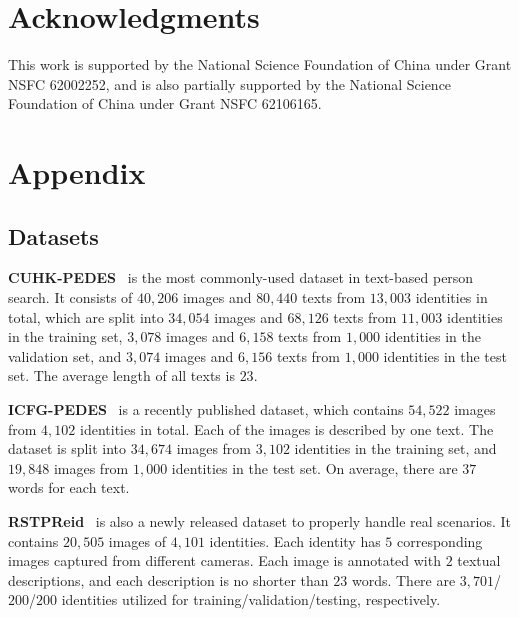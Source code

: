 \documentclass{article}
\begin{document}
\section*{Acknowledgments}
This work is supported by the National Science Foundation of China under Grant NSFC 62002252, and is also partially supported by the National Science Foundation of China under Grant NSFC 62106165.







\appendix
\section{Appendix}

\subsection{Datasets}
\label{datasets}
\textbf{CUHK-PEDES}~\cite{li2017person} is the most commonly-used dataset in text-based person search. It consists of $40,206$ images and $80,440$ texts from $13,003$ identities in total, which are split into $34,054$ images and $68,126$ texts from $11,003$ identities in the training set, $3,078$ images and $6,158$ texts from $1,000$ identities in the validation set, and $3,074$ images and $6,156$ texts from $1,000$ identities in the test set. The average length of all texts is $23$. 

\noindent\textbf{ICFG-PEDES}~\cite{ding2021semantically} is a recently published dataset, which contains $54,522$ images from $4,102$ identities in total. Each of the images is described by one text. The dataset is split into $34,674$ images from $3,102$ identities in the training set, and $19,848$ images from $1,000$ identities in the test set. On average, there are $37$ words for each text.

\noindent\textbf{RSTPReid}~\cite{zhu2021dssl} is also a newly released dataset to properly handle real scenarios. It contains $20,505$ images of $4,101$ identities. Each identity has $5$ corresponding images captured from different cameras. Each image is annotated with $2$ textual descriptions, and each description is no shorter than $23$ words. There are $3,701$/$200$/$200$ identities utilized for training/validation/testing, respectively.
\end{document}

